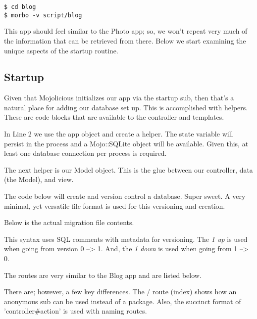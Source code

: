 \documentclass[14pt]{extreport}
\begin{document}
\begin{lstlisting}[style=BashInputStyle]
$ cd blog
$ morbo -v script/blog
\end{lstlisting}

This app should feel similar to the Photo app; so, we won't repeat very much of
the information that can be retrieved from there.  Below we start examining the
unique aspects of the startup routine.

\subsection{Startup}

Given that Mojolicious initializes our app via the startup sub, then that's a
natural place for adding our database set up.  This is accomplished with
helpers. These are code blocks that are available to the controller and
templates.



In Line 2 we use the app object and create a helper.  The state variable will
persist in the process and a Mojo::SQLite object will be available.  Given
this, at least one database connection per process is required.

The next helper is our Model object.  This is the glue between our controller,
data (the Model), and view.

The code below will create and version control a database.  Super sweet.  A
very minimal, yet versatile file format is used for this versioning and
creation.



Below is the actual migration file contents.



This syntax uses SQL comments with metadata for versioning.  The  \textit{1 up}
is used when going from version 0 --> 1.  And, the \textit{1 down} is used when
going from 1 --> 0.

The routes are very similar to the Blog app and are listed below.



There are; however, a few key differences.  The / route (index) shows how an
anonymous sub can be used instead of a package.  Also, the succinct format of
'controller\#action' is used with naming routes.  
\end{document}
